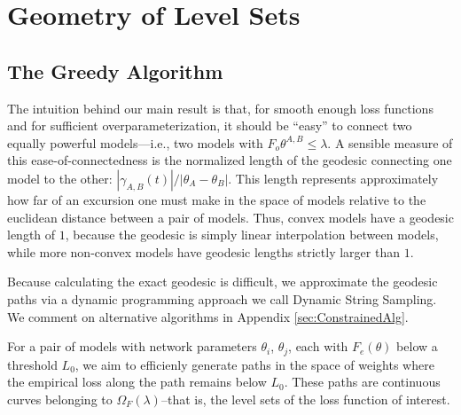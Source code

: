 

\section{Geometry of Level Sets}
\label{sec:QuanNoncon}

\subsection{The Greedy Algorithm}
\label{sec:GreedyAlg}
 
 The intuition behind our main result is that, for smooth enough loss functions and for sufficient overparameterization, it should be ``easy'' to connect two equally powerful models---i.e., two models with $F_o{\theta^{A,B}} \leq \lambda$.  A sensible measure of this ease-of-connectedness is the normalized length of the geodesic connecting one model to the other: $|\gamma_{A,B}(t)| / |\theta_A - \theta_B|$.  This length represents approximately how far of an excursion one must make in the space of models relative to the euclidean distance between a pair of models.  Thus, convex models have a geodesic length of $1$, because the geodesic is simply linear interpolation between models, while more non-convex models have geodesic lengths strictly larger than $1$.
 
 Because calculating the exact geodesic is difficult, we approximate the geodesic paths via a dynamic programming approach we call Dynamic String Sampling.  We comment on alternative algorithms in Appendix \ref{sec:ConstrainedAlg}.
 
 For a pair of models with network parameters $\theta_i$, $\theta_j$, each with $F_e(\theta)$ below a threshold $L_0$, we aim to efficienly generate paths in the space of weights where the empirical loss along the path remains below $L_0$.  These paths are continuous curves belonging to $\Omega_F(\lambda)$--that is, the level sets of the loss function of interest.

